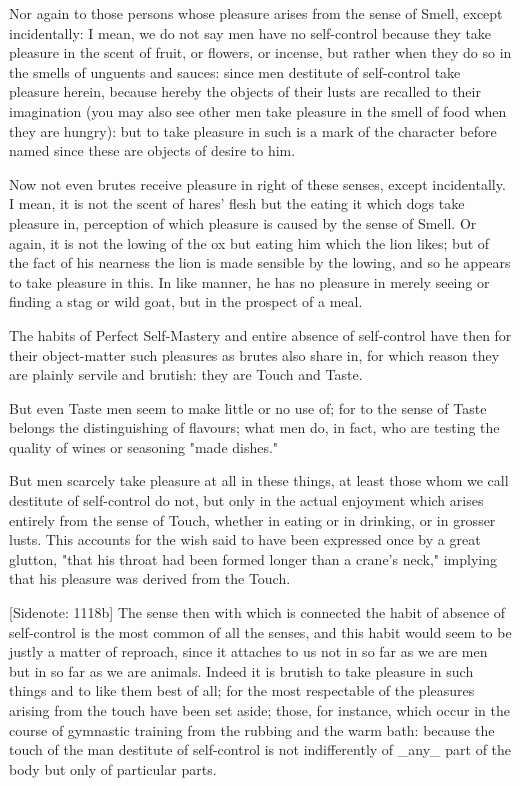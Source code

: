 Nor again to those persons whose pleasure arises from the sense
of Smell, except incidentally: I mean, we do not say men have no
self-control because they take pleasure in the scent of fruit, or
flowers, or incense, but rather when they do so in the smells of
unguents and sauces: since men destitute of self-control take pleasure
herein, because hereby the objects of their lusts are recalled to their
imagination (you may also see other men take pleasure in the smell of
food when they are hungry): but to take pleasure in such is a mark of
the character before named since these are objects of desire to him.

Now not even brutes receive pleasure in right of these senses, except
incidentally. I mean, it is not the scent of hares' flesh but the eating
it which dogs take pleasure in, perception of which pleasure is caused
by the sense of Smell. Or again, it is not the lowing of the ox but
eating him which the lion likes; but of the fact of his nearness the
lion is made sensible by the lowing, and so he appears to take pleasure
in this. In like manner, he has no pleasure in merely seeing or finding
a stag or wild goat, but in the prospect of a meal.

The habits of Perfect Self-Mastery and entire absence of self-control
have then for their object-matter such pleasures as brutes also share
in, for which reason they are plainly servile and brutish: they are
Touch and Taste.

But even Taste men seem to make little or no use of; for to the sense of
Taste belongs the distinguishing of flavours; what men do, in fact, who
are testing the quality of wines or seasoning "made dishes."

But men scarcely take pleasure at all in these things, at least those
whom we call destitute of self-control do not, but only in the actual
enjoyment which arises entirely from the sense of Touch, whether in
eating or in drinking, or in grosser lusts. This accounts for the wish
said to have been expressed once by a great glutton, "that his throat
had been formed longer than a crane's neck," implying that his pleasure
was derived from the Touch.

[Sidenote: 1118b] The sense then with which is connected the habit of
absence of self-control is the most common of all the senses, and this
habit would seem to be justly a matter of reproach, since it attaches to
us not in so far as we are men but in so far as we are animals. Indeed
it is brutish to take pleasure in such things and to like them best of
all; for the most respectable of the pleasures arising from the touch
have been set aside; those, for instance, which occur in the course of
gymnastic training from the rubbing and the warm bath: because the touch
of the man destitute of self-control is not indifferently of _any_ part
of the body but only of particular parts.

